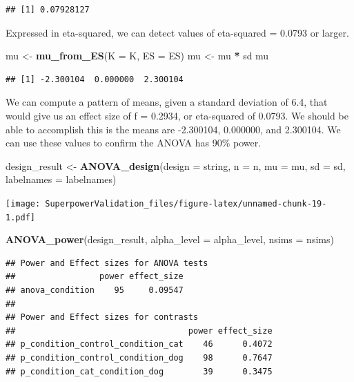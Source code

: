 \documentclass[]{book}
\newenvironment{Shaded}{\begin{snugshade}}{\end{snugshade}}
\newcommand{\DataTypeTok}[1]{\textcolor[rgb]{0.13,0.29,0.53}{#1}}
\newcommand{\KeywordTok}[1]{\textcolor[rgb]{0.13,0.29,0.53}{\textbf{#1}}}
\newcommand{\NormalTok}[1]{#1}
\newcommand{\OperatorTok}[1]{\textcolor[rgb]{0.81,0.36,0.00}{\textbf{#1}}}
\newcommand{\StringTok}[1]{\textcolor[rgb]{0.31,0.60,0.02}{#1}}
\begin{document}
\begin{verbatim}
## [1] 0.07928127
\end{verbatim}

Expressed in eta-squared, we can detect values of eta-squared = 0.0793 or larger.

\begin{Shaded}
\begin{Highlighting}[]
\NormalTok{mu <-}\StringTok{ }\KeywordTok{mu_from_ES}\NormalTok{(}\DataTypeTok{K =}\NormalTok{ K, }\DataTypeTok{ES =}\NormalTok{ ES)}
\NormalTok{mu <-}\StringTok{ }\NormalTok{mu }\OperatorTok{*}\StringTok{ }\NormalTok{sd}
\NormalTok{mu}
\end{Highlighting}
\end{Shaded}

\begin{verbatim}
## [1] -2.300104  0.000000  2.300104
\end{verbatim}

We can compute a pattern of means, given a standard deviation of 6.4, that would give us an effect size of f = 0.2934, or eta-squared of 0.0793. We should be able to accomplish this is the means are -2.300104, 0.000000, and 2.300104. We can use these values to confirm the ANOVA has 90\% power.

\begin{Shaded}
\begin{Highlighting}[]
\NormalTok{design_result <-}\StringTok{ }\KeywordTok{ANOVA_design}\NormalTok{(}\DataTypeTok{design =}\NormalTok{ string,}
                   \DataTypeTok{n =}\NormalTok{ n, }
                   \DataTypeTok{mu =}\NormalTok{ mu, }
                   \DataTypeTok{sd =}\NormalTok{ sd, }
                   \DataTypeTok{labelnames =}\NormalTok{ labelnames)}
\end{Highlighting}
\end{Shaded}

\texttt{[image: SuperpowerValidation\_files/figure-latex/unnamed-chunk-19-1.pdf]}

\begin{Shaded}
\begin{Highlighting}[]
\KeywordTok{ANOVA_power}\NormalTok{(design_result, }\DataTypeTok{alpha_level =}\NormalTok{ alpha_level, }\DataTypeTok{nsims =}\NormalTok{ nsims)}
\end{Highlighting}
\end{Shaded}

\begin{verbatim}
## Power and Effect sizes for ANOVA tests
##                 power effect_size
## anova_condition    95     0.09547
## 
## Power and Effect sizes for contrasts
##                                   power effect_size
## p_condition_control_condition_cat    46      0.4072
## p_condition_control_condition_dog    98      0.7647
## p_condition_cat_condition_dog        39      0.3475
\end{verbatim}
\end{document}
